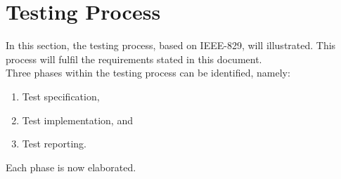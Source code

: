 \documentclass[12pt]{article}
\begin{document}
\newpage
{}
\tableofcontents
\newpage
\listoffigures

\newpage
{}
  

\section{Testing Process}
In this section, the testing process, based on IEEE-829, will illustrated. This process will fulfil the requirements stated in this document.\\
\indent Three phases within the testing process can be identified, namely:
\begin{enumerate}
	\item Test specification,
	\item Test implementation, and
	\item Test reporting.
\end{enumerate}
Each phase is now elaborated.
\end{document}

